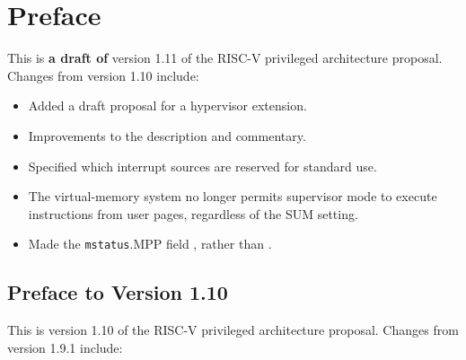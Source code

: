 \chapter{Preface}

This is {\bf a draft of} version 1.11 of the RISC-V privileged
architecture proposal.  Changes from version 1.10 include:

\begin{itemize}
  \parskip 0pt
  \itemsep 1pt
\item Added a draft proposal for a hypervisor extension.
\item Improvements to the description and commentary.
\item Specified which interrupt sources are reserved for standard use.
\item The virtual-memory system no longer permits supervisor mode to execute
  instructions from user pages, regardless of the SUM setting.
\item Made the {\tt mstatus}.MPP field \warl, rather than \wlrl.
\end{itemize}

\newpage

\section*{Preface to Version 1.10}

This is version 1.10 of the RISC-V privileged
architecture proposal.  Changes from version 1.9.1 include:

